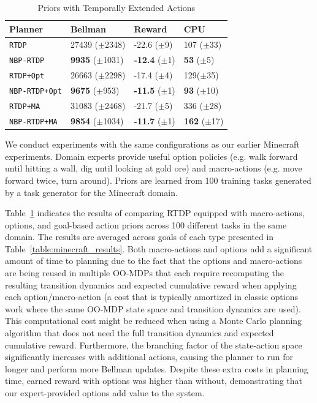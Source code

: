\documentclass[11pt]{article}
\begin{document}
\begin{table}[b]
\centering
{}
\small
\begin{tabular}{@{}llll@{}}\toprule
Planner & Bellman & Reward & CPU \\ \midrule
\texttt{RTDP}   			&	27439 ($\pm$2348)		&	-22.6 ($\pm$9)		& 107 ($\pm$33) \\
\texttt{NBP-RTDP} 			& 	{\bf 9935} ($\pm$1031)	&	{\bf -12.4} ($\pm$1)& {\bf 53} ($\pm$5) \\ \hline
\texttt{RTDP+Opt}  		&	26663 ($\pm$2298)		&	-17.4 ($\pm$4) 		& 129($\pm$35) \\
\texttt{NBP-RTDP+Opt} 		& 	{\bf 9675} ($\pm$953)	&	{\bf -11.5} ($\pm$1)	&{\bf 93} ($\pm$10) \\ \hline
\texttt{RTDP+MA}  		&	31083 ($\pm$2468)		&	-21.7	 ($\pm$5)		&336 ($\pm$28) \\
\texttt{NBP-RTDP+MA}  		& 	{\bf 9854} ($\pm$1034)	&	{\bf -11.7} ($\pm$1)	&{\bf 162} ($\pm$17) \\ %
\bottomrule
\end{tabular}
\caption{Priors with Temporally Extended Actions}
\label{table:temp_ext_act_results}
\end{table}

We conduct experiments with the same configurations as our earlier Minecraft experiments. Domain experts provide
useful option policies (e.g. walk forward until hitting a wall, dig until looking at gold ore) and macro-actions (e.g. move forward twice, turn around). Priors are learned from 100 training tasks generated by a task generator for the Minecraft domain.

Table~\ref{table:temp_ext_act_results} indicates the results of
comparing RTDP equipped with macro-actions, options, and goal-based action priors
across 100 different tasks in the same domain. The results are averaged across goals of each type
presented in Table~\ref{table:minecraft_results}. Both macro-actions
and options add a significant amount of time to planning due to the
fact that the options and macro-actions are being reused in
multiple OO-MDPs that each require recomputing the resulting transition
dynamics and expected cumulative reward when applying each
option/macro-action (a cost that is typically amortized in classic
options work where the same OO-MDP state space and transition dynamics
are used). This computational cost might be reduced when using a Monte
Carlo planning algorithm that does not need the full transition
dynamics and expected cumulative reward.  Furthermore, the branching
factor of the state-action space significantly increases with
additional actions, causing the planner to run for longer and perform
more Bellman updates.  Despite these extra costs in planning time,
earned reward with options was higher than without, demonstrating that
our expert-provided options add value to the system.
\end{document}
